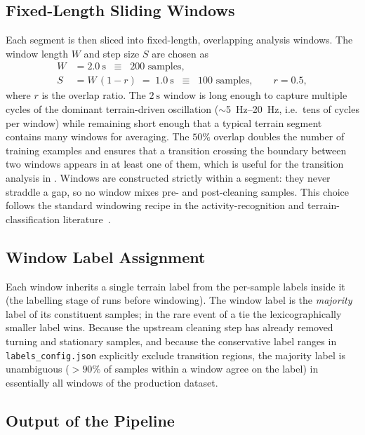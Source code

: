\subsection{Fixed-Length Sliding Windows}

Each segment is then sliced into fixed-length, overlapping analysis windows. The window length $W$ and step size $S$ are chosen as
\begin{align}
    W &= \SI{2.0}{\second} \;\;\equiv\;\; 200 \text{ samples},
        \label{eq:window_size} \\
    S &= W \,(1 - r) \;=\; \SI{1.0}{\second} \;\;\equiv\;\; 100 \text{ samples},
        \qquad r = 0.5,
        \label{eq:step_size}
\end{align}
where $r$ is the overlap ratio. The $\SI{2}{\second}$ window is long enough to capture multiple cycles of the dominant terrain-driven oscillation ($\sim$\SIrange{5}{20}{\hertz}, i.e.\ tens of cycles per window) while remaining short enough that a typical terrain segment contains many windows for averaging. The $50\%$ overlap doubles the number of training examples and ensures that a transition crossing the boundary between two windows appears in at least one of them, which is useful for the transition analysis in . Windows are constructed strictly within a segment: they never straddle a gap, so no window mixes pre- and post-cleaning samples. This choice follows the standard windowing recipe in the activity-recognition and terrain-classification literature~\cite{Brooks2005,Bao2004}.

\subsection{Window Label Assignment}

Each window inherits a single terrain label from the per-sample labels inside it (the labelling stage of  runs before windowing). The window label is the \emph{majority} label of its constituent samples; in the rare event of a tie the lexicographically smaller label wins. Because the upstream cleaning step has already removed turning and stationary samples, and because the conservative label ranges in \texttt{labels\_config.json} explicitly exclude transition regions, the majority label is unambiguous (\(>\!90\%\) of samples within a window agree on the label) in essentially all windows of the production dataset.

\subsection{Output of the Pipeline}

